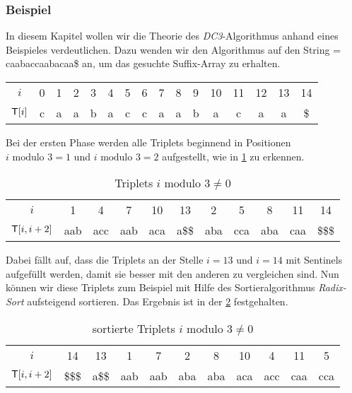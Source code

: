 \subsubsection{Beispiel}
\label{dc3:algorithmus:beispiel}


In diesem Kapitel wollen wir die Theorie des \emph{DC3}-Al\-go\-rith\-mus anhand eines Beispieles verdeutlichen. Dazu wenden wir den Al\-go\-rith\-mus auf den String  = caabaccaabacaa\$ an, um das gesuchte Suffix-Array zu erhalten.

\begin{table}[H]
	\centering
	\begin{tabular}{c| c c c c c c c c c c c c c c c}
		$i$ & 0 & 1 & 2 & 3 & 4 & 5 & 6 & 7 & 8 & 9 & 10 & 11 & 12 & 13 & 14 \\
		$\inputtext[i]$ & c & a & a & b & a & c & c & a & a & b & a & c & a & a & \$
	\end{tabular}
\end{table}

Bei der ersten Phase werden alle Triplets beginnend in Positionen\\$i \text{ modulo } 3 = 1$ und $i \text{ modulo } 3 = 2$ aufgestellt, wie in \cref{tab:unsortierteTriplets} zu erkennen.

\begin{table}[H]
	\centering
	\begin{tabular}{c| c c c c c ||  c c c c c }
		$i$ & 1 & 4 & 7 & 10 & 13 & 2 & 5 & 8 & 11 & 14\\
		$\inputtext[i, i+2]$ & aab & acc & aab & aca & a\$\$ & aba & cca & aba & caa & \$\$\$
	\end{tabular}
	\caption{Triplets $i \text{ modulo } 3 \neq 0$}
	\label{tab:unsortierteTriplets}
\end{table}

Dabei fällt auf, dass die Triplets an der Stelle $i = 13$ und $i = 14$ mit Sentinels aufgefüllt werden, damit sie besser mit den anderen zu vergleichen sind. Nun können wir diese Triplets zum Beispiel mit Hilfe des Sortieralgorithmus \emph{Radix-Sort} aufsteigend sortieren. Das Ergebnis ist in der \cref{tab:sortierteTriplets} festgehalten.

\begin{table}[H]
	\centering
	\begin{tabular}{c| c c c c c c c c c c}
		$i$ & 14 & 13 & 1 & 7 & 2 & 8 & 10 & 4 & 11 & 5\\
		$\inputtext[i, i+2]$ & \$\$\$ & a\$\$ & aab & aab & aba & aba & aca & acc & caa & cca 
	\end{tabular}
	\caption{sortierte Triplets $i \text{ modulo } 3 \neq 0$}
	\label{tab:sortierteTriplets}
\end{table}


